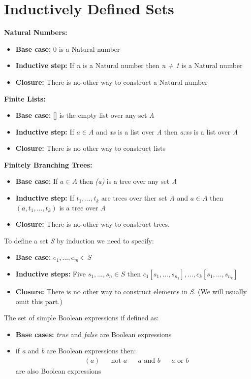 \section{Inductively Defined Sets} %
\label{sec:inductively_defined_sets}
\textbf{Natural Numbers:}
\begin{itemize}
    \item \textbf{Base case:} 0 is a Natural number
    \item \textbf{Inductive step:} If \emph{n} is a Natural number then \emph{n + 1} is a Natural number
    \item \textbf{Closure:} There is no other way to construct a Natural number
\end{itemize}
\textbf{Finite Lists:}
\begin{itemize}
    \item \textbf{Base case:} [] is the empty list over any set \emph{A}
    \item \textbf{Inductive step:} If $a \in A$ and \emph{xs} is a list over \emph{A} then \emph{a:xs} is a list over \emph{A}
    \item \textbf{Closure:} There is no other way to construct lists
\end{itemize}
\textbf{Finitely Branching Trees:}
\begin{itemize}
    \item \textbf{Base case:} If $a \in A$ then \emph{(a)} is a tree over any set \emph{A}
    \item \textbf{Inductive step:} If $t_1,..., t_k$ are trees over ther set \emph{A} and $a \in A$ then $(a, t_1,..., t_k)$ is a tree over \emph{A}
    \item \textbf{Closure:} There is no other way to construct trees.
\end{itemize}
To define a set \emph{S} by induction we need to specify:
\begin{itemize}
    \item \textbf{Base case:} $e_1,..., e_m \in S$
    \item \textbf{Inductive steps:} Five $s_1,..., s_n \in S$ then $c_1[s_1,..., s_{n_1}],..., c_k[s_1,...,s_{n_k}]$
    \item \textbf{Closure:} There is no other way to construct elements in \emph{S}. (We will usually omit this part.)
\end{itemize}
\begin{Ex}
    The set of simple Boolean expressions if defined as:
    \begin{itemize}
        \item \textbf{Base cases:} \emph{true} and \emph{false} are Boolean expressions
        \item if \emph{a} and \emph{b} are Boolean expressions then:
            \begin{align*}
                &(a)
                &&\mbox{not }a
                &&a \mbox{ and }b
                &&a \mbox{ or }b
            \end{align*}
            are also Boolean expressions
    \end{itemize}
\end{Ex}

